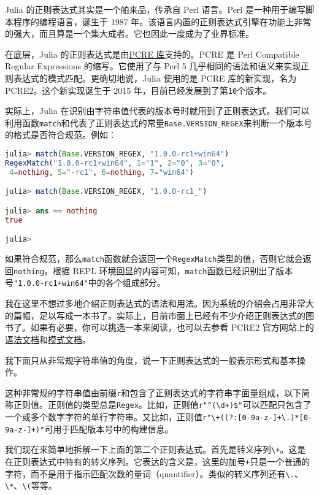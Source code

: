 Julia 的正则表达式其实是一个舶来品，传承自 Perl 语言。Perl 是一种用于编写脚本程序的编程语言，诞生于 1987 年。该语言内置的正则表达式引擎在功能上非常的强大，而且算是一个集大成者。它也因此一度成为了业界标准。

在底层，Julia 的正则表达式是由\href{https://www.pcre.org}{PCRE 库}支持的。PCRE 是 Perl Compatible Regular Expressions 的缩写。它使用了与 Perl 5 几乎相同的语法和语义来实现正则表达式的模式匹配。更确切地说，Julia 使用的是 PCRE 库的新实现，名为 PCRE2。这个新实现诞生于 2015 年，目前已经发展到了第\verb|10|个版本。

实际上，Julia 在识别由字符串值代表的版本号时就用到了正则表达式。我们可以利用函数\verb|match|和代表了正则表达式的常量\verb|Base.VERSION_REGEX|来判断一个版本号的格式是否符合规范。例如：
\begin{lstlisting}[language=julia]
julia> match(Base.VERSION_REGEX, "1.0.0-rc1+win64")
RegexMatch("1.0.0-rc1+win64", 1="1", 2="0", 3="0",
 4=nothing, 5="-rc1", 6=nothing, 7="win64")

julia> match(Base.VERSION_REGEX, "1.0.0-rc1_")

julia> ans == nothing
true

julia> 
\end{lstlisting}

如果符合规范，那么\verb|match|函数就会返回一个\verb|RegexMatch|类型的值，否则它就会返回\verb|nothing|。根据 REPL 环境回显的内容可知，\verb|match|函数已经识别出了版本号\verb|"1.0.0-rc1+win64"|中的各个组成部分。

我在这里不想过多地介绍正则表达式的语法和用法。因为系统的介绍会占用非常大的篇幅，足以写成一本书了。实际上，目前市面上已经有不少介绍正则表达式的图书了。如果有必要，你可以挑选一本来阅读，也可以去参看 PCRE2 官方网站上的\href{https://www.pcre.org/current/doc/html/pcre2syntax.html}{语法文档}和\href{https://www.pcre.org/current/doc/html/pcre2pattern.html}{模式文档}。

我下面只从非常规字符串值的角度，说一下正则表达式的一般表示形式和基本操作。

这种非常规的字符串值由前缀\verb|r|和包含了正则表达式的字符串字面量组成，以下简称正则值。正则值的类型总是\verb|Regex|。比如，正则值\verb|r"^(\d+)$"|可以匹配只包含了一个或多个数字字符的单行字符串。又比如，正则值\verb|r"\+((?:[0-9a-z-]+\.)*[0-9a-z-]+)"|可用于匹配版本号中的构建信息。

我们现在来简单地拆解一下上面的第二个正则表达式。首先是转义序列\verb|\+|。这是在正则表达式中特有的转义序列。它表达的含义是，这里的加号\verb|+|只是一个普通的字符，而不是用于指示匹配次数的量词（quantifier）。类似的转义序列还有\verb|\.|、\verb|\*|、\verb|\(|等等。

